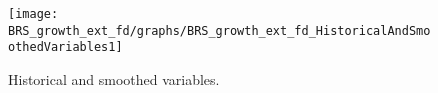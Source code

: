  
\begin{figure}[H]
\centering 
\texttt{[image: BRS\_growth\_ext\_fd/graphs/BRS\_growth\_ext\_fd\_HistoricalAndSmoothedVariables1]}
\caption{Historical and smoothed variables.}\label{Fig:HistoricalAndSmoothedVariables:1}
\end{figure}


